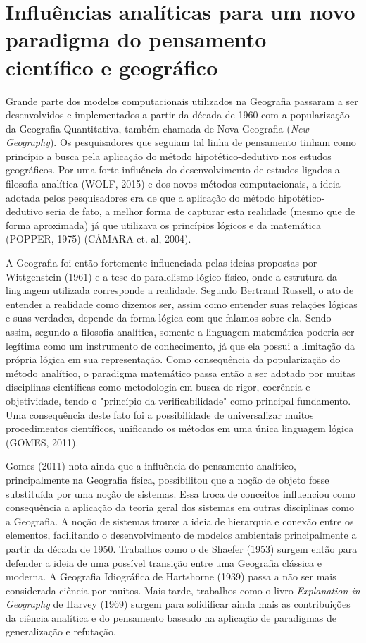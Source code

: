\section{Influências analíticas para um novo paradigma do pensamento científico e geográfico}
Grande parte dos modelos computacionais utilizados na Geografia passaram a ser desenvolvidos e implementados a partir da década de 1960 com a popularização da Geografia Quantitativa, também chamada de Nova Geografia (\textit{New Geography}). Os pesquisadores que seguiam tal linha de pensamento tinham como princípio a busca pela aplicação do método hipotético-dedutivo nos estudos geográficos. Por uma forte influência do desenvolvimento de estudos ligados a filosofia analítica (WOLF, 2015)\cite{WOLF} e dos novos métodos computacionais, a ideia adotada pelos pesquisadores era de que a aplicação do método hipotético-dedutivo seria de fato, a melhor forma de capturar esta realidade (mesmo que de forma aproximada) já que utilizava os princípios lógicos e da matemática (POPPER, 1975)\cite{POPPER} (CÂMARA et. al, 2004)\cite{CAMARA_etal04}.

A Geografia foi então fortemente influenciada pelas ideias propostas por Wittgenstein (1961)\cite{WITTGENSTEIN} e a tese do paralelismo lógico-físico, onde a estrutura da linguagem utilizada corresponde a realidade. Segundo Bertrand Russell, o ato de entender a realidade como dizemos ser, assim como entender suas relações lógicas e suas verdades, depende da forma lógica com que falamos sobre ela. Sendo assim, segundo a filosofia analítica, somente a linguagem matemática poderia ser legítima como um instrumento de conhecimento, já que ela possui a limitação da própria lógica em sua representação. Como consequência da popularização do método analítico, o paradigma matemático passa então a ser adotado por muitas disciplinas científicas como metodologia em busca de rigor, coerência e objetividade, tendo o "princípio da verificabilidade" como principal fundamento. Uma consequência deste fato foi a possibilidade de universalizar muitos procedimentos científicos, unificando os métodos em uma única linguagem lógica (GOMES, 2011)\cite{GOMES}.

Gomes (2011)\cite{GOMES} nota ainda que a influência do pensamento analítico, principalmente na Geografia física, possibilitou que a noção de objeto fosse substituída por uma noção de sistemas. Essa troca de conceitos influenciou como consequência a aplicação da teoria geral dos sistemas em outras disciplinas como a Geografia. A noção de sistemas trouxe a ideia de hierarquia e conexão entre os elementos, facilitando o desenvolvimento de modelos ambientais principalmente a partir da década de 1950. Trabalhos como o de Shaefer (1953)\cite{SCHAEFER} surgem então para defender a ideia de uma possível transição entre uma Geografia clássica e moderna. A Geografia Idiográfica de Hartshorne (1939)\cite{HARTSHORNE} passa a não ser mais considerada ciência por muitos. Mais tarde, trabalhos como o livro \textit{Explanation in Geography} de Harvey (1969)\cite{HARVEY} surgem para solidificar ainda mais as contribuições da ciência analítica e do pensamento baseado na aplicação de paradigmas de generalização e refutação.

